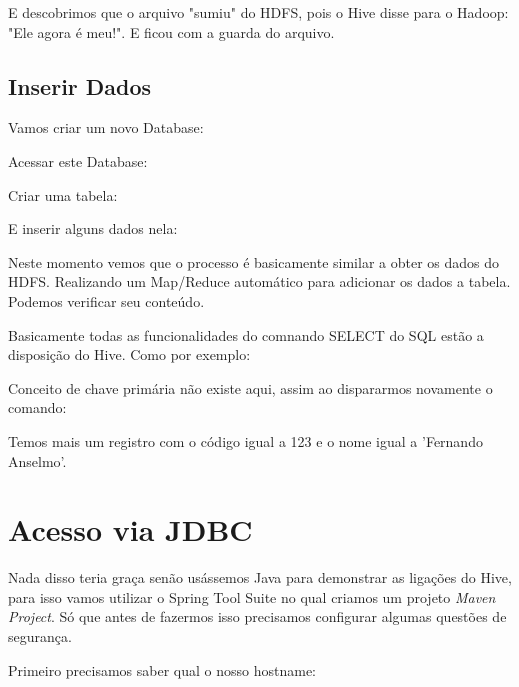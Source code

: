 \documentclass[a4paper,11pt]{article}
\begin{document}
E descobrimos que o arquivo "sumiu" do HDFS, pois o Hive disse para o Hadoop: "Ele agora é meu!". E ficou com a guarda do arquivo.

\subsection{Inserir Dados}
Vamos criar um novo Database: \\

Acessar este Database: \\

Criar uma tabela: \\

E inserir alguns dados nela: \\

Neste momento vemos que o processo é basicamente similar a obter os dados do HDFS. Realizando um Map/Reduce automático para adicionar os dados a tabela. Podemos verificar seu conteúdo. \\

Basicamente todas as funcionalidades do comnando SELECT do SQL estão a disposição do Hive. Como por exemplo: \\

Conceito de chave primária não existe aqui, assim ao dispararmos novamente o comando: \\

Temos mais um registro com o código igual a 123 e o nome igual a 'Fernando Anselmo'.

\section{Acesso via JDBC}
Nada disso teria graça senão usássemos Java para demonstrar as ligações do Hive, para isso vamos utilizar o Spring Tool Suite no qual criamos um projeto \textit{Maven Project}. Só que antes de fazermos isso precisamos configurar algumas questões de segurança.

Primeiro precisamos saber qual o nosso hostname: \\
\end{document}
